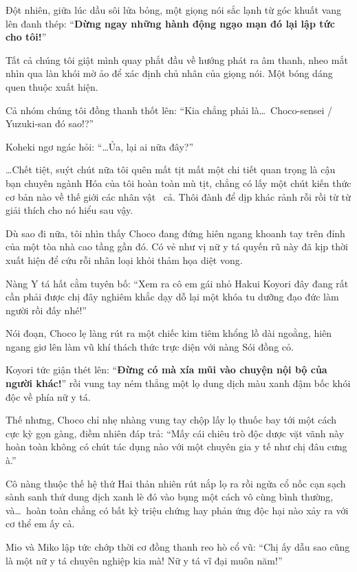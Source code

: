 \documentclass[../main.tex]{subfiles}
\begin{document}
Đột nhiên, giữa lúc dầu sôi lửa bỏng, một giọng nói sắc lạnh từ góc khuất vang lên đanh thép: ``\textbf{Dừng ngay những hành động ngạo mạn đó lại lập tức cho tôi!}''

Tất cả chúng tôi giật mình quay phắt đầu về hướng phát ra âm thanh, nheo mắt nhìn qua làn khói mờ ảo để xác định chủ nhân của giọng nói. Một bóng dáng quen thuộc xuất hiện.

Cả nhóm chúng tôi đồng thanh thốt lên: ``Kia chẳng phải là\dots\ Choco-sensei / Yuzuki-san đó sao!?''

Koheki ngơ ngác hỏi: ``\dots Ủa, lại ai nữa đây?''

\dots Chết tiệt, suýt chút nữa tôi quên mất tịt mất một chi tiết quan trọng là cậu bạn chuyên ngành Hóa của tôi hoàn toàn mù tịt, chẳng có lấy một chút kiến thức cơ bản nào về thế giới các nhân vật \hll\ cả. Thôi đành để dịp khác rảnh rỗi rồi từ từ giải thích cho nó hiểu sau vậy.

Dù sao đi nữa, tôi nhìn thấy Choco đang đứng hiên ngang khoanh tay trên đỉnh của một tòa nhà cao tầng gần đó. Có vẻ như vị nữ y tá quyến rũ này đã kịp thời xuất hiện để cứu rỗi nhân loại khỏi thảm họa diệt vong.

Nàng Y tá hất cằm tuyên bố: ``Xem ra cô em gái nhỏ Hakui Koyori đây đang rất cần phải được chị đây nghiêm khắc dạy dỗ lại một khóa tu dưỡng đạo đức làm người rồi đấy nhé!''

Nói đoạn, Choco lẹ làng rút ra một chiếc kim tiêm khổng lồ dài ngoằng, hiên ngang giơ lên làm vũ khí thách thức trực diện với nàng Sói đồng cỏ.


Koyori tức giận thét lên: ``\textbf{Đừng có mà xía mũi vào chuyện nội bộ của người khác!}'' rồi vung tay ném thẳng một lọ dung dịch màu xanh đậm bốc khói độc về phía nữ y tá.

Thế nhưng, Choco chỉ nhẹ nhàng vung tay chộp lấy lọ thuốc bay tới một cách cực kỳ gọn gàng, điềm nhiên đáp trả: ``Mấy cái chiêu trò độc dược vặt vãnh này hoàn toàn không có chút tác dụng nào với một chuyên gia y tế như chị đâu cưng à.''

Cô nàng thuộc thế hệ thứ Hai thản nhiên rút nắp lọ ra rồi ngửa cổ nốc cạn sạch sành sanh thứ dung dịch xanh lè đó vào bụng một cách vô cùng bình thường, và\dots\ hoàn toàn chẳng có bất kỳ triệu chứng hay phản ứng độc hại nào xảy ra với cơ thể em ấy cả.

Mio và Miko lập tức chớp thời cơ đồng thanh reo hò cổ vũ: ``Chị ấy dẫu sao cũng là một nữ y tá chuyên nghiệp kia mà! Nữ y tá vĩ đại muôn năm!''
\end{document}
